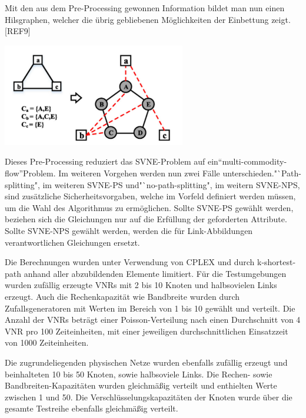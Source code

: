 \documentclass{lni}
\begin{document}
Mit den aus dem Pre-Processing gewonnen Information bildet man nun einen Hilsgraphen, welcher die übrig gebliebenen Möglichkeiten der Einbettung zeigt.[REF9]\newline
\begin{center}
	\includegraphics[width=0.6\textwidth]{auxgraph.pdf}\newline 
\end{center}
Dieses Pre-Processing reduziert das SVNE-Problem auf ein"`multi-commodity-flow"'Problem. \cite{MCF}
Im weiteren Vorgehen werden nun zwei Fälle unterschieden."`Path-splitting", im weiteren SVNE-PS und"`no-path-splitting", im weitern SVNE-NPS, sind zusätzliche Sicherheitsvorgaben, welche im Vorfeld definiert werden müssen, um die Wahl des Algorithmus zu ermöglichen. Sollte SVNE-PS gewählt werden, beziehen sich die Gleichungen nur auf die Erfüllung der geforderten Attribute.
Sollte SVNE-NPS gewählt werden, werden die für Link-Abbildungen verantwortlichen Gleichungen ersetzt.\newline

Die Berechnungen wurden unter Verwendung von CPLEX und durch k-shortest-path anhand aller abzubildenden Elemente limitiert\cite{CPLEX}.
Für die Testumgebungen wurden zufällig erzeugte VNRs mit 2 bis 10 Knoten und halbsovielen Links erzeugt. Auch die Rechenkapazität wie Bandbreite wurden durch Zufallsgeneratoren mit Werten im Bereich von 1 bis 10 gewählt und verteilt. Die Anzahl der VNRs beträgt einer Poisson-Verteilung nach einen Durchschnitt von 4 VNR pro 100 Zeiteinheiten, mit einer jeweiligen durchschnittlichen Einsatzzeit von 1000 Zeiteinheiten.

Die zugrundeliegenden physischen Netze wurden ebenfalls zufällig erzeugt und beinhalteten 10 bis 50 Knoten, sowie halbsoviele Links. Die Rechen- sowie Bandbreiten-Kapazitäten wurden gleichmäßig verteilt und enthielten Werte zwischen 1 und 50. Die Verschlüsselungskapazitäten der Knoten  wurde über die gesamte Testreihe ebenfalls gleichmäßig verteilt.
\end{document}
